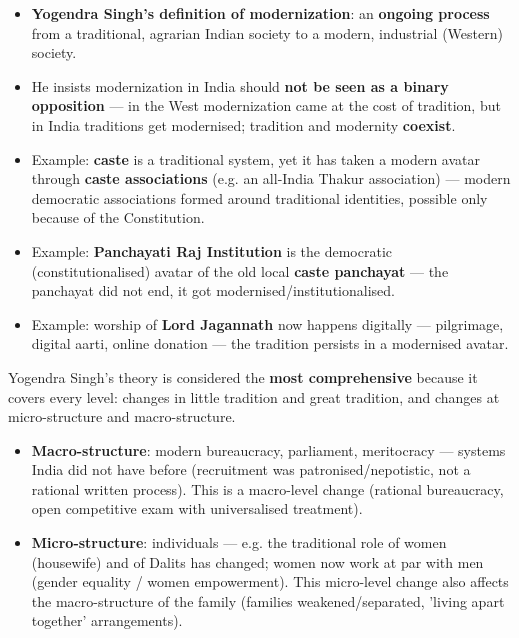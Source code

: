 \begin{KeyConcept}
\begin{itemize}
\item \textbf{Yogendra Singh's definition of modernization}: an \textbf{ongoing process} from a traditional, agrarian Indian society to a modern, industrial (Western) society.
\item He insists modernization in India should \textbf{not be seen as a binary opposition} --- in the West modernization came at the cost of tradition, but in India traditions get modernised; tradition and modernity \textbf{coexist}.
\item Example: \textbf{caste} is a traditional system, yet it has taken a modern avatar through \textbf{caste associations} (e.g. an all-India Thakur association) --- modern democratic associations formed around traditional identities, possible only because of the Constitution.
\item Example: \textbf{Panchayati Raj Institution} is the democratic (constitutionalised) avatar of the old local \textbf{caste panchayat} --- the panchayat did not end, it got modernised/institutionalised.
\item Example: worship of \textbf{Lord Jagannath} now happens digitally --- pilgrimage, digital aarti, online donation --- the tradition persists in a modernised avatar.
\end{itemize}
\end{KeyConcept}

Yogendra Singh's theory is considered the \textbf{most comprehensive} because it covers every level: changes in little tradition and great tradition, and changes at micro-structure and macro-structure.

\begin{itemize}
\item \textbf{Macro-structure}: modern bureaucracy, parliament, meritocracy --- systems India did not have before (recruitment was patronised/nepotistic, not a rational written process). This is a macro-level change (rational bureaucracy, open competitive exam with universalised treatment).
\item \textbf{Micro-structure}: individuals --- e.g. the traditional role of women (housewife) and of Dalits has changed; women now work at par with men (gender equality / women empowerment). This micro-level change also affects the macro-structure of the family (families weakened/separated, 'living apart together' arrangements).
\end{itemize}

